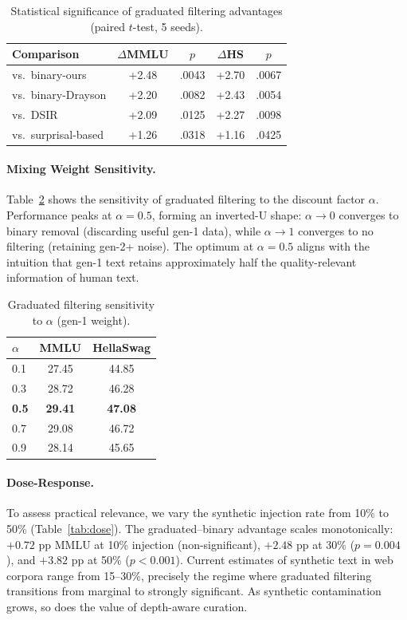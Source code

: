 \documentclass[11pt,a4paper]{article}
\begin{document}
\begin{table}[t]
\centering
\small
\caption{Statistical significance of graduated filtering advantages (paired $t$-test, 5 seeds).}
\label{tab:significance}
\begin{tabular}{lcccc}
\toprule
\textbf{Comparison} & \textbf{$\Delta$MMLU} & \textbf{$p$} & \textbf{$\Delta$HS} & \textbf{$p$} \\
\midrule
vs.\ binary-ours & +2.48 & .0043 & +2.70 & .0067 \\
vs.\ binary-Drayson & +2.20 & .0082 & +2.43 & .0054 \\
vs.\ DSIR & +2.09 & .0125 & +2.27 & .0098 \\
vs.\ surprisal-based & +1.26 & .0318 & +1.16 & .0425 \\
\bottomrule
\end{tabular}
\end{table}

\paragraph{Mixing Weight Sensitivity.}
Table~\ref{tab:alpha} shows the sensitivity of graduated filtering to the discount factor $\alpha$.
Performance peaks at $\alpha=0.5$, forming an inverted-U shape: $\alpha \to 0$ converges to binary removal (discarding useful gen-1 data), while $\alpha \to 1$ converges to no filtering (retaining gen-2+ noise).
The optimum at $\alpha=0.5$ aligns with the intuition that gen-1 text retains approximately half the quality-relevant information of human text.

\begin{table}[t]
\centering
\small
\caption{Graduated filtering sensitivity to $\alpha$ (gen-1 weight).}
\label{tab:alpha}
\begin{tabular}{lcc}
\toprule
\textbf{$\alpha$} & \textbf{MMLU} & \textbf{HellaSwag} \\
\midrule
0.1 & 27.45 & 44.85 \\
0.3 & 28.72 & 46.28 \\
\textbf{0.5} & \textbf{29.41} & \textbf{47.08} \\
0.7 & 29.08 & 46.72 \\
0.9 & 28.14 & 45.65 \\
\bottomrule
\end{tabular}
\end{table}

\paragraph{Dose-Response.}
To assess practical relevance, we vary the synthetic injection rate from 10\% to 50\% (Table~\ref{tab:dose}).
The graduated--binary advantage scales monotonically: $+0.72$ pp MMLU at 10\% injection (non-significant), $+2.48$ pp at 30\% ($p=0.004$), and $+3.82$ pp at 50\% ($p<0.001$).
Current estimates of synthetic text in web corpora range from 15--30\%, precisely the regime where graduated filtering transitions from marginal to strongly significant.
As synthetic contamination grows, so does the value of depth-aware curation.
\end{document}
